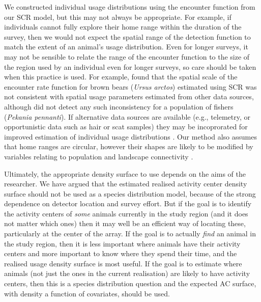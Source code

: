 \documentclass[useAMS,usenatbib,referee]{biom}
\begin{document}
We constructed individual usage distributions using the encounter function from our SCR model, but this may not always be
appropriate. For example, if individuals cannot fully explore their home range within the duration of the survey, then we would not expect the spatial range of the detection function to match the extent of an animal's usage distribution. Even for longer surveys, it may not be sensible to relate the range of the encounter function to the size of the region used by an individual even for longer surveys, so care should be taken when this practice is used. For example, \cite{Tenan+al:17} found that the spatial scale of the encounter rate function for brown bears (\emph{Ursus arctos}) estimated using SCR was not consistent with spatial usage parameters estimated from other data sources, although \cite{Popescu+al:14} did not detect any such inconsistency for a population of fishers (\emph{Pekania pennanti}). If alternative data sources are available (e.g., telemetry, or opportunistic data such as hair or scat samples) they may be incoprorated for improved estimation of individual usage distributions \citep{Tenan+al:17}. Our method also assumes that home ranges are circular, however their shapes are likely to be modified by variables relating to population and landscape connectivity \citep[see][for a review]{Drake+al:ip}.

Ultimately, the appropriate density surface to use depends on the aims of the researcher. We have argued that the estimated realised activity center density surface should not be used as a species distribution model, because of the strong dependence on detector location and survey effort. But if the goal is to identify the activity centers of {\it some} animals currently in the study region (and it does not matter which ones) then it may well be an efficient way of locating these, particularly at the center of the array. If the goal is to actually {\it find} an animal in the study region, then it is less important where animals have their activity centers and more important to know where they spend their time, and the realised usage density surface is most useful. If the goal is to estimate where animals (not just the ones in the current realisation) are likely to have activity centers, then this is a species distribution question and the expected AC surface, with density a function of covariates, should be used.
\end{document}
